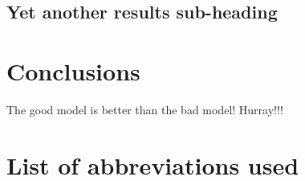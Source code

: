   \subsection*{Yet another results sub-heading}


\section*{Conclusions}
The good model is better than the bad model! Hurray!!! \pb
  

\section*{List of abbreviations used}
    

